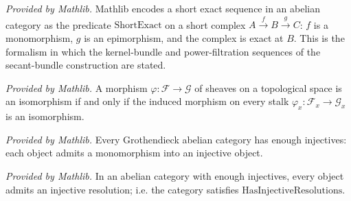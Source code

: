 \begin{definition}
  \label{mathlib:short_exact}
  \mathlibok
  \textit{Provided by Mathlib.}
  Mathlib encodes a short exact sequence in an abelian category as the predicate
  \(\mathrm{ShortExact}\) on a short complex \(A\xrightarrow{f}B\xrightarrow{g}C\):
  \(f\) is a monomorphism, \(g\) is an epimorphism, and the complex is exact at
  \(B\).  This is the formalism in which the kernel-bundle and power-filtration
  sequences of the secant-bundle construction are stated.
\end{definition}

\begin{lemma}
  \label{mathlib:stalk_locality}
  \mathlibok
  \textit{Provided by Mathlib.}
  A morphism \(\varphi:\mathcal F\to\mathcal G\) of sheaves on a topological
  space is an isomorphism if and only if the induced morphism on every stalk
  \(\varphi_x:\mathcal F_x\to\mathcal G_x\) is an isomorphism.
\end{lemma}

\begin{lemma}
  \label{mathlib:groth_enough_injectives}
  \mathlibok
  \textit{Provided by Mathlib.}
  Every Grothendieck abelian category has enough injectives: each object admits a
  monomorphism into an injective object.
\end{lemma}

\begin{lemma}
  \label{mathlib:enough_inj_has_resolutions}
  \mathlibok
  \textit{Provided by Mathlib.}
  In an abelian category with enough injectives, every object admits an injective
  resolution; i.e. the category satisfies \(\mathrm{HasInjectiveResolutions}\).
\end{lemma}

